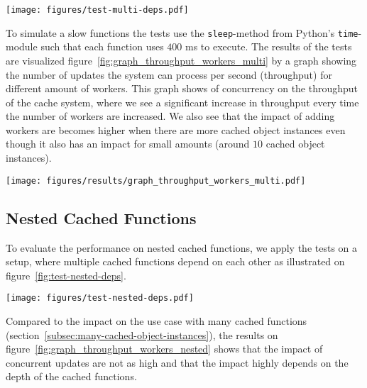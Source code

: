 \begin{figure*}[ht!]
  \centering
  \texttt{[image: figures/test-multi-deps.pdf]}
  \caption{Illustration of the dependencies of the cached function for the "Many Cached Functions" test case}
  \label{fig:test-multi-deps}
\end{figure*}

To simulate a slow functions the tests use the \verb$sleep$-method from Python's \verb$time$-module such that each function uses $400$ ms to execute. The results of the tests are visualized figure~\ref{fig:graph_throughput_workers_multi} by a graph showing the number of updates the system can process per second (throughput) for different amount of workers. This graph shows of concurrency on the throughput of the cache system, where we see a significant increase in throughput every time the number of workers are increased. We also see that the impact of adding workers are becomes higher when there are more cached object instances even though it also has an impact for small amounts (around $10$ cached object instances).

\begin{figure*}[ht!]
  \centering
  \texttt{[image: figures/results/graph\_throughput\_workers\_multi.pdf]}
  \caption{How the system scales with many cached functions depending on the same underlying data while the number of workers is increased}
  \label{fig:graph_throughput_workers_multi}
\end{figure*}


\subsection{Nested Cached Functions}
\label{subsec:nested-cached-functions}

To evaluate the performance on nested cached functions, we apply the tests on a setup, where multiple cached functions depend on each other as illustrated on figure~\ref{fig:test-nested-deps}.

\begin{figure*}[ht!]
  \centering
  \texttt{[image: figures/test-nested-deps.pdf]}
  \caption{Illustration of the dependencies of the cached function for the "Nested Cached Functions" test case}
  \label{fig:test-nested-deps}
\end{figure*}

Compared to the impact on the use case with many cached functions (section~\ref{subsec:many-cached-object-instances}), the results on figure~\ref{fig:graph_throughput_workers_nested} shows that the impact of concurrent updates are not as high and that the impact highly depends on the depth of the cached functions.

